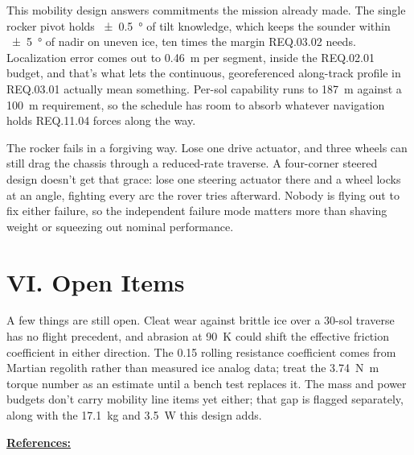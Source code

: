 \documentclass[11pt]{article}
\begin{document}
This mobility design answers commitments the mission already made. The single rocker pivot holds
\SI{\pm 0.5}{\degree} of tilt knowledge, which keeps the sounder within \SI{\pm 5}{\degree} of nadir on uneven
ice, ten times the margin REQ.03.02 needs. Localization error comes out to \SI{0.46}{m} per segment, inside the
REQ.02.01 budget, and that's what lets the continuous, georeferenced along-track profile in REQ.03.01 actually
mean something. Per-sol capability runs to \SI{187}{m} against a \SI{100}{m} requirement, so the schedule has
room to absorb whatever navigation holds REQ.11.04 forces along the way.

The rocker fails in a forgiving way. Lose one drive actuator, and three wheels can still drag the chassis
through a reduced-rate traverse. A four-corner steered design doesn't get that grace: lose one steering
actuator there and a wheel locks at an angle, fighting every arc the rover tries afterward. Nobody is flying out
to fix either failure, so the independent failure mode matters more than shaving weight or squeezing out nominal
performance.

\bigskip

\section*{VI. Open Items}

A few things are still open. Cleat wear against brittle ice over a \num{30}-sol traverse has no flight
precedent, and abrasion at \SI{90}{K} could shift the effective friction coefficient in either direction. The
\num{0.15} rolling resistance coefficient comes from Martian regolith rather than measured ice analog data;
treat the \SI{3.74}{N.m} torque number as an estimate until a bench test replaces it. The mass and power
budgets don't carry mobility line items yet either; that gap is flagged separately, along with the
\SI{17.1}{kg} and \SI{3.5}{W} this design adds.

\bigskip

\noindent\underline{\textbf{References:}}
\end{document}
